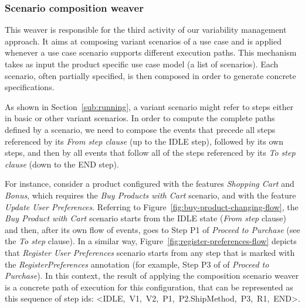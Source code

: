 % 
% 
% 




\subsubsection{Scenario composition weaver}\label{sub:sc-weaver}

This weaver is responsible for the third activity of our variability management
approach. It aims at composing variant scenarios of a use case and is applied whenever a use case scenario supports different execution paths.
This mechanism takes as input the product specific use case model (a list of scenarios). Each scenario, often partially specified, is then composed in order to generate concrete specifications.

As shown in Section~\ref{sub:running}, a variant scenario
might refer to steps either in basic or other variant scenarios. In order
to compute the complete paths defined by a scenario, we need to compose the events that precede all steps referenced by its \emph{From step
clause} (up to the IDLE step), followed by its own steps, and then by all
events that follow all of the steps referenced by its \emph{To step clause} (down to the END step).

For instance, consider a product configured with the features \emph{Shopping Cart} and \emph{Bonus}, which requires the \emph{Buy Products with Cart} scenario, and with the feature \emph{Update User Preferences}. Referring to Figure~\ref{fig:buy-product-changing-flow}, the  \emph{Buy Product with Cart} scenario starts from the IDLE state (\emph{From step} clause) and then, after its own flow of events, goes to Step P1 of \emph{Proceed to Purchase} (see the \emph{To step} clause). In a similar way, Figure~\ref{fig:register-preferences-flow} depicts that \emph{Register User Preferences} scenario starts from any step that is marked with the \emph{RegisterPreferences} annotation (for example, Step P3 of of \emph{Proceed to Purchase}). In this context, the result of applying the composition scenario weaver is a concrete path of execution for this configuration, that can be represented as this sequence of step ids: \mbox{<IDLE, V1, V2, P1, P2.ShipMethod, P3, R1, END>}.

